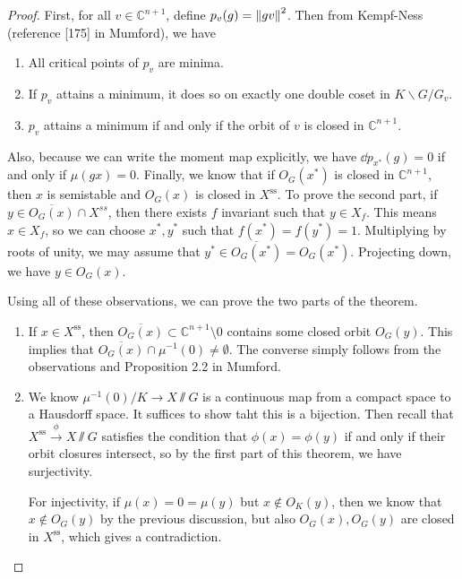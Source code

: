 \documentclass[leqno, openany]{memoir}
\theoremstyle{definition}
\theoremstyle{remark}
\theoremstyle{plain}
\theoremstyle{definition}
\theoremstyle{remark}
\newcommand{\C}{\mathbb{C}}
\newcommand{\mr}[1]{\mathrm{#1}}
\newcommand{\ol}[1]{\overline{#1}}
\begin{document}
\begin{proof}
    First, for all $v \in \C^{n+1}$, define $p_v(g) = \norm{gv}^2$. Then from Kempf-Ness (reference [175] in Mumford), we have
    \begin{enumerate}[label=(\roman*)]
        \item All critical points of $p_v$ are minima.
        \item If $p_v$ attains a minimum, it does so on exactly one double coset in $K \backslash G / G_v$.
        \item $p_v$ attains a minimum if and only if the orbit of $v$ is closed in $\C^{n+1}$.
    \end{enumerate}
    Also, because we can write the moment map explicitly, we have $\dd{p}_{x^*}(g) = 0$ if and only if $\mu(gx) = 0$. Finally, we know that if $O_G(x^*)$ is closed in $\C^{n+1}$, then $x$ is semistable and $O_G(x)$ is closed in $X^{\mr{ss}}$. To prove the second part, if $y \in \ol{O_G(x)} \cap X^{ss}$, then there exists $f$ invariant such that $y \in X_f$. This means $x \in X_f$, so we can choose $x^*, y^*$ such that $f(x^*) = f(y^*) = 1$. Multiplying by roots of unity, we may assume that $y^* \in \ol{O_G(x^*)} = O_G(x^*)$. Projecting down, we have $y \in O_G(x)$.

    Using all of these observations, we can prove the two parts of the theorem.
    \begin{enumerate}
        \item If $x \in X^{\mr{ss}}$, then $\ol{O_G(x)} \subset \C^{n+1} \setminus \qty{0}$ contains some closed orbit $O_G(y)$. This implies that $\ol{O_G(x)} \cap \mu^{-1}(0) \neq \emptyset$. The converse simply follows from the observations and Proposition 2.2 in Mumford.
        \item We know $\mu^{-1}(0)/K \to X \sslash G$ is a continuous map from a compact space to a Hausdorff space. It suffices to show taht this is a bijection. Then recall that $X^{\mr{ss}} \xrightarrow{\phi} X \sslash G$ satisfies the condition that $\phi(x) = \phi(y)$ if and only if their orbit closures intersect, so by the first part of this theorem, we have surjectivity.

            For injectivity, if $\mu(x) = 0 = \mu(y)$ but $x \notin O_K(y)$, then we know that $x \notin O_G(y)$ by the previous discussion, but also $O_G(x), O_G(y)$ are closed in $X^{\mr{ss}}$, which gives a contradiction. \qedhere
    \end{enumerate}
\end{proof}
\end{document}
